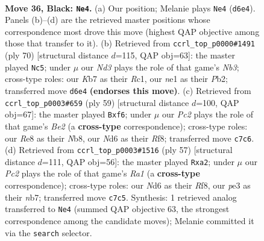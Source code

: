 \documentclass[11pt]{article}
\begin{document}
\clearpage

\begin{figure}[p]\centering
\begin{subfigure}{0.46\textwidth}\centering
\resizebox{\linewidth}{!}{%
\newchessgame
\chessboard[
  setfen={r3r3/1kp5/pP1n1B2/1b1N1p2/7R/1B2P3/1P4P1/R2KN3 b - - 0 36},
  showmover=false,
  pgfstyle=straightmove, color=movearrow, markmove={d6-e4}
]}
\caption{}
\end{subfigure}\hfill
\begin{subfigure}{0.46\textwidth}\centering
\resizebox{\linewidth}{!}{%
\newchessgame
\chessboard[
  setfen={3rbk2/5pb1/p1n4r/Pp1pP2P/5P2/1N3B2/1P3KP1/2RR4 w - - 11 36},
  showmover=false,
  pgfstyle=straightmove, color=movearrow, markmove={b3-c5}
]}
\caption{}
\end{subfigure}
\\[4pt]
\begin{subfigure}{0.46\textwidth}\centering
\resizebox{\linewidth}{!}{%
\newchessgame
\chessboard[
  setfen={1n3r2/4bk1p/p1r1pPpP/1p1n4/3P4/1P3N2/R2B1PB1/4R1K1 b - - 0 30},
  showmover=false,
  pgfstyle=straightmove, color=movearrow, markmove={e7-f6}
]}
\caption{}
\end{subfigure}\hfill
\begin{subfigure}{0.46\textwidth}\centering
\resizebox{\linewidth}{!}{%
\newchessgame
\chessboard[
  setfen={r4rk1/1N3ppp/3Pnb2/4p3/8/1P2BP2/R1P1B2P/3K2R1 b - - 0 29},
  showmover=false,
  pgfstyle=straightmove, color=movearrow, markmove={a8-a2}
]}
\caption{}
\end{subfigure}
\caption{\textbf{Move 36, Black: \texttt{Ne4}.} (a) Our position; Melanie plays \texttt{Ne4} (\texttt{d6e4}). Panels (b)--(d) are the retrieved master positions whose correspondence most drove this move (highest QAP objective among those that transfer to it). (b) Retrieved from \texttt{ccrl\_top\_p0000\#1491} (ply 70) [structural distance $d$=115, QAP obj=63]: the master played \texttt{Nc5}; under $\mu$ our \emph{Nd3} plays the role of that game's \emph{Nb3}; cross-type roles: our \emph{K}b7 as their \emph{R}c1, our \emph{n}e1 as their \emph{P}b2; transferred move \texttt{d6e4} \textbf{(endorses this move)}. (c) Retrieved from \texttt{ccrl\_top\_p0003\#659} (ply 59) [structural distance $d$=100, QAP obj=67]: the master played \texttt{Bxf6}; under $\mu$ our \emph{Pc2} plays the role of that game's \emph{Be2} (a \textbf{cross-type} correspondence); cross-type roles: our \emph{R}e8 as their \emph{N}b8, our \emph{N}d6 as their \emph{R}f8; transferred move \texttt{c7c6}. (d) Retrieved from \texttt{ccrl\_top\_p0003\#1516} (ply 57) [structural distance $d$=111, QAP obj=56]: the master played \texttt{Rxa2}; under $\mu$ our \emph{Pc2} plays the role of that game's \emph{Ra1} (a \textbf{cross-type} correspondence); cross-type roles: our \emph{N}d6 as their \emph{R}f8, our \emph{p}e3 as their \emph{n}b7; transferred move \texttt{c7c5}. Synthesis: 1 retrieved analog transferred to \texttt{Ne4} (summed QAP objective 63, the strongest correspondence among the candidate moves); Melanie committed it via the \texttt{search} selector.}
\label{fig:thought-m71}
\end{figure}
\end{document}
